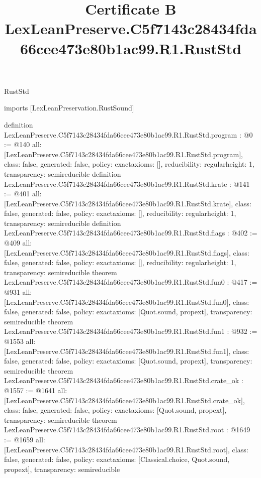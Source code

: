 \begin{lexlean}{RustStd}
\title{Certificate B LexLeanPreserve.C5f7143c28434fda66cee473e80b1ac99.R1.RustStd}
\begin{coremodule}
imports [LexLeanPreservation.RustSound]

definition LexLeanPreserve.C5f7143c28434fda66cee473e80b1ac99.R1.RustStd.program : @0 := @140 {
  all: [LexLeanPreserve.C5f7143c28434fda66cee473e80b1ac99.R1.RustStd.program],
  class: false,
  generated: false,
  policy: exact{axioms: []},
  reducibility: regular{height: 1},
  transparency: semireducible
}
definition LexLeanPreserve.C5f7143c28434fda66cee473e80b1ac99.R1.RustStd.krate : @141 := @401 {
  all: [LexLeanPreserve.C5f7143c28434fda66cee473e80b1ac99.R1.RustStd.krate],
  class: false,
  generated: false,
  policy: exact{axioms: []},
  reducibility: regular{height: 1},
  transparency: semireducible
}
definition LexLeanPreserve.C5f7143c28434fda66cee473e80b1ac99.R1.RustStd.flags : @402 := @409 {
  all: [LexLeanPreserve.C5f7143c28434fda66cee473e80b1ac99.R1.RustStd.flags],
  class: false,
  generated: false,
  policy: exact{axioms: []},
  reducibility: regular{height: 1},
  transparency: semireducible
}
theorem LexLeanPreserve.C5f7143c28434fda66cee473e80b1ac99.R1.RustStd.fun0 : @417 := @931 {
  all: [LexLeanPreserve.C5f7143c28434fda66cee473e80b1ac99.R1.RustStd.fun0],
  class: false,
  generated: false,
  policy: exact{axioms: [Quot.sound, propext]},
  transparency: semireducible
}
theorem LexLeanPreserve.C5f7143c28434fda66cee473e80b1ac99.R1.RustStd.fun1 : @932 := @1553 {
  all: [LexLeanPreserve.C5f7143c28434fda66cee473e80b1ac99.R1.RustStd.fun1],
  class: false,
  generated: false,
  policy: exact{axioms: [Quot.sound, propext]},
  transparency: semireducible
}
theorem LexLeanPreserve.C5f7143c28434fda66cee473e80b1ac99.R1.RustStd.crate_ok : @1557 := @1641 {
  all: [LexLeanPreserve.C5f7143c28434fda66cee473e80b1ac99.R1.RustStd.crate_ok],
  class: false,
  generated: false,
  policy: exact{axioms: [Quot.sound, propext]},
  transparency: semireducible
}
theorem LexLeanPreserve.C5f7143c28434fda66cee473e80b1ac99.R1.RustStd.root : @1649 := @1659 {
  all: [LexLeanPreserve.C5f7143c28434fda66cee473e80b1ac99.R1.RustStd.root],
  class: false,
  generated: false,
  policy: exact{axioms: [Classical.choice, Quot.sound, propext]},
  transparency: semireducible
}


\end{coremodule}
\end{lexlean}
